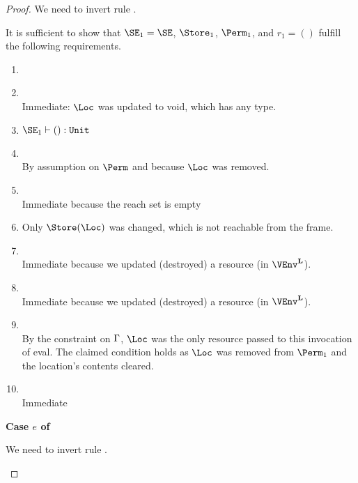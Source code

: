 \begin{proof}
  We need to invert rule .
  \begin{mathpar}
  \end{mathpar}
  It is sufficient to show that $\SE_1 = \SE$,
  $\Store_1$, $\Perm_1$, and $r_1 = ()$ fulfill the following
  requirements.
  \begin{enumerate}[({R}1)]
  \item {}
  \item {} \\
    Immediate: $\Loc$ was updated to void, which has any type.
  \item $\SE_1 \vdash () : \tunit$
  \item {}\\
    By assumption on $\Perm$ and because $\Loc$ was removed.
  \item {} \\
    Immediate because the reach set is empty
  \item {} 
    Only $\Store (\Loc)$ was changed, which is not reachable from the frame.
  \item {} \\
    Immediate because we updated (destroyed) a resource (in $\Active\VEnv$).
  \item {} \\
    Immediate because we updated (destroyed) a resource (in $\Active\VEnv$).
  \item {} \\
    By the constraint on $\E$, $\Loc$ was the only resource passed to
    this invocation of eval. The claimed condition holds as $\Loc$ was
    removed from $\Perm_1$ and the location's contents cleared.
  \item {}
    \\ Immediate
  \end{enumerate}

  \newpage
  \textbf{Case $e$ of}

  We need to invert rule .
  \begin{mathpar}
  \end{mathpar}


\end{proof}
